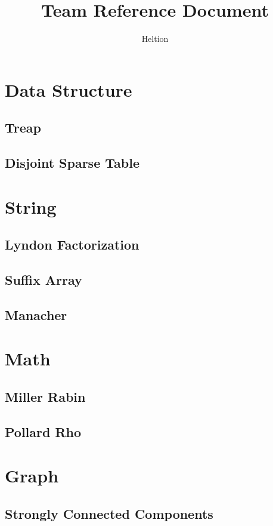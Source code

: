 \documentclass{article}
\begin{document}
\title{Team Reference Document}
\author{Heltion}
\maketitle
\newpage
\begin{multicols}{2}
    \tableofcontents
    \newpage
    \section{Data Structure}
    \subsection{Treap}
    
    \subsection{Disjoint Sparse Table}
    

    \section{String}
    \subsection{Lyndon Factorization}
    
    \subsection{Suffix Array}
    
    \subsection{Manacher}
    
    
    \section{Math}
    \subsection{Miller Rabin}
    
    \subsection{Pollard Rho}
    

    \section{Graph}
    \subsection{Strongly Connected Components}
    
\end{multicols}
\end{document}
